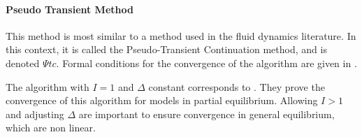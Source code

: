 \documentclass[english]{article}
\begin{document}
	\paragraph{Pseudo Transient Method} 	This method is most similar to a method used in the fluid dynamics literature. In this context, it is called the Pseudo-Transient Continuation method, and is denoted $\Psi tc$. Formal conditions for the convergence of the algorithm are given in  \citet{kelley1998convergence}.\par
	The algorithm with $I=1$ and $\Delta$ constant corresponds to \citet{achdou2014heterogeneous}. They prove the convergence of this algorithm for models in partial equilibrium. Allowing $I > 1$ and adjusting $\Delta$  are important to ensure convergence in general equilibrium, which are non linear.

	
	
\end{document}
